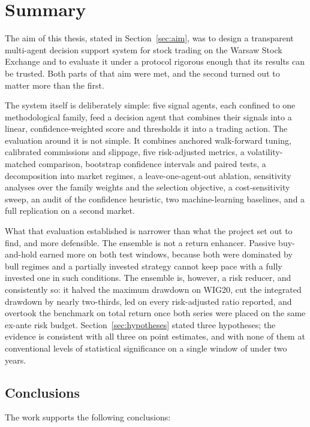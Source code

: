 \chapter{Summary}\label{sec:conclusion}

The aim of this thesis, stated in Section~\ref{sec:aim}, was to design a transparent multi-agent decision support system for stock trading on the Warsaw Stock Exchange and to evaluate it under a protocol rigorous enough that its results can be trusted. Both parts of that aim were met, and the second turned out to matter more than the first.

The system itself is deliberately simple: five signal agents, each confined to one methodological family, feed a decision agent that combines their signals into a linear, confidence-weighted score and thresholds it into a trading action. The evaluation around it is not simple. It combines anchored walk-forward tuning, calibrated commissions and slippage, five risk-adjusted metrics, a volatility-matched comparison, bootstrap confidence intervals and paired tests, a decomposition into market regimes, a leave-one-agent-out ablation, sensitivity analyses over the family weights and the selection objective, a cost-sensitivity sweep, an audit of the confidence heuristic, two machine-learning baselines, and a full replication on a second market.

What that evaluation established is narrower than what the project set out to find, and more defensible. The ensemble is not a return enhancer. Passive buy-and-hold earned more on both test windows, because both were dominated by bull regimes and a partially invested strategy cannot keep pace with a fully invested one in such conditions. The ensemble is, however, a risk reducer, and consistently so: it halved the maximum drawdown on WIG20, cut the integrated drawdown by nearly two-thirds, led on every risk-adjusted ratio reported, and overtook the benchmark on total return once both series were placed on the same ex-ante risk budget. Section~\ref{sec:hypotheses} stated three hypotheses; the evidence is consistent with all three on point estimates, and with none of them at conventional levels of statistical significance on a single window of under two years.

\section{Conclusions}\label{sec:conclusions}

The work supports the following conclusions:

